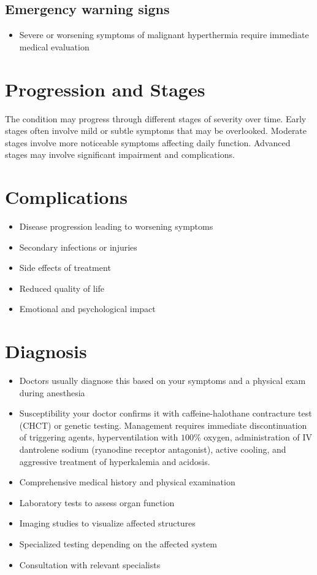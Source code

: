 \subsection{Emergency warning signs}
\begin{itemize}[noitemsep]
  \item Severe or worsening symptoms of malignant hyperthermia require immediate medical evaluation
\end{itemize}
\section{Progression and Stages}
The condition may progress through different stages of severity over time. Early stages often involve mild or subtle symptoms that may be overlooked. Moderate stages involve more noticeable symptoms affecting daily function. Advanced stages may involve significant impairment and complications.
\section{Complications}
\begin{itemize}[noitemsep]
  \item Disease progression leading to worsening symptoms
  \item Secondary infections or injuries
  \item Side effects of treatment
  \item Reduced quality of life
  \item Emotional and psychological impact
\end{itemize}
\section{Diagnosis}
\begin{itemize}[noitemsep]
  \item Doctors usually diagnose this based on your symptoms and a physical exam during anesthesia
  \item Susceptibility your doctor confirms it with caffeine-halothane contracture test (CHCT) or genetic testing. Management requires immediate discontinuation of triggering agents, hyperventilation with $100\%$ oxygen, administration of IV dantrolene sodium (ryanodine receptor antagonist), active cooling, and aggressive treatment of hyperkalemia and acidosis.
  \item Comprehensive medical history and physical examination
  \item Laboratory tests to assess organ function
  \item Imaging studies to visualize affected structures
  \item Specialized testing depending on the affected system
  \item Consultation with relevant specialists
\end{itemize}
